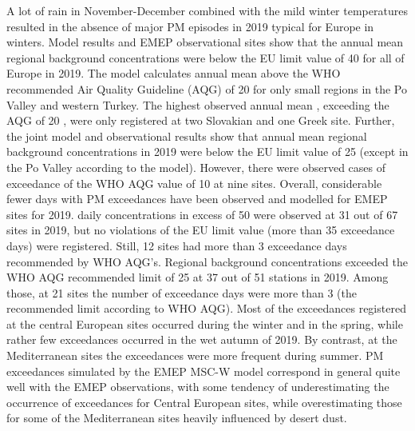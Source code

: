 A lot of rain in November-December combined with the mild winter temperatures resulted in the absence of major PM episodes in 2019 typical for Europe in winters. Model results and EMEP observational sites show that the annual mean regional background \PM[10] concentrations were below the EU limit value of 40 \ug for all of Europe in 2019. The model calculates annual mean \PM[10] above the WHO recommended Air Quality Guideline (AQG) of 20 \ug for only small regions in the Po Valley and western Turkey. The highest observed annual mean \PM[10], exceeding the AQG of 20 \ug, were only registered at two Slovakian and one Greek site. Further, the joint model and observational results show that annual mean regional background \PM[2.5] concentrations in 2019 were below the EU limit value of 25 \ug (except in the Po Valley according to the model). However, there were observed cases of exceedance of the WHO AQG value of 10 \ug at nine sites.
Overall, considerable fewer days with PM exceedances have been observed and modelled for EMEP sites for 2019. \PM[10] daily concentrations in excess of 50 \ug were observed at 31 out of 67 sites in 2019, but no violations of the \PM[10] EU limit value (more than 35 exceedance days) were registered. Still, 12 sites had more than 3 exceedance days recommended by WHO AQG’s. %
Regional background \PM[2.5] concentrations exceeded the WHO AQG recommended limit of 25 \ug at 37 out of 51 stations in 2019. Among those, at 21 sites the number of exceedance days were more than 3 (the recommended limit according to WHO AQG).  %
Most of the exceedances registered at the central European sites occurred during the winter and in the spring, while rather few exceedances occurred in the wet autumn of 2019. By contrast, at the Mediterranean sites the exceedances were more frequent during summer. PM exceedances simulated by the EMEP MSC-W model correspond in general quite well with the EMEP observations, with some tendency of underestimating the occurrence of exceedances for Central European sites, while overestimating those for some of the Mediterranean sites heavily influenced by desert dust.



 

